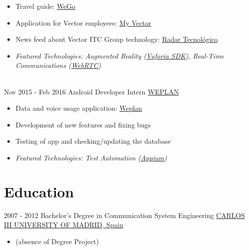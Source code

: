 \documentclass[letterpaper]{twentysecondcv} %
\begin{document}
\begin{twenty}
{{\begin{itemize}
        \item Travel guide: \href{https://play.google.com/store/apps/details?id=com.wego.bcn&hl=es}{WeGo}
        \item Application for Vector employees:
		\href{https://play.google.com/store/apps/details?id=com.vectormobile.myvector&hl=es}{My Vector}
		\item News feed about Vector ITC Group technology:
		\href{https://play.google.com/store/apps/details?id=com.vectormobile.trends&hl=es}{Radar Tecnológico}
		\item \textit{Featured Technologies: {Augmented Reality (\href{https://www.vuforia.com/}{Vuforia SDK})}, Real-Time Communications (\href{https://webrtc.org/}{WebRTC})}
    \end{itemize}}
        }
     \\
     \twentyitem
   		{Nov 2015 -}
		{Feb 2016}
        {Android Developer Intern}
        {\href{http://weplan-app.com/}{WEPLAN}}
        {}
        {
        \begin{itemize}
        \item Data and voice usage application: \href{https://play.google.com/store/apps/details?id=com.cumberland.tutarifa&hl=en}{Weplan}
        \item Development of new features and fixing bugs
        \item Testing of app and checking/updating the database
        \item \textit{Featured Technologies: Test Automation (\href{https://play.google.com/store/apps/details?id=com.cumberland.tutarifa&hl=en}{Appium})} 
    \end{itemize}
    	}
        
\end{twenty}

\section{Education}

\begin{twenty} %
	\twentyitem
    	{2007 - 2012}
        {}
        {Bachelor's Degree in Communication System Engineering}
        \newline
       {\href{https://www.uc3m.es/Home}{CARLOS III UNIVERSITY OF MADRID, Spain}}
       {\begin{itemize}
       \item (absence of Degree Project)
       \end{itemize}}
        {}
        {}
\end{twenty}
\end{document}
